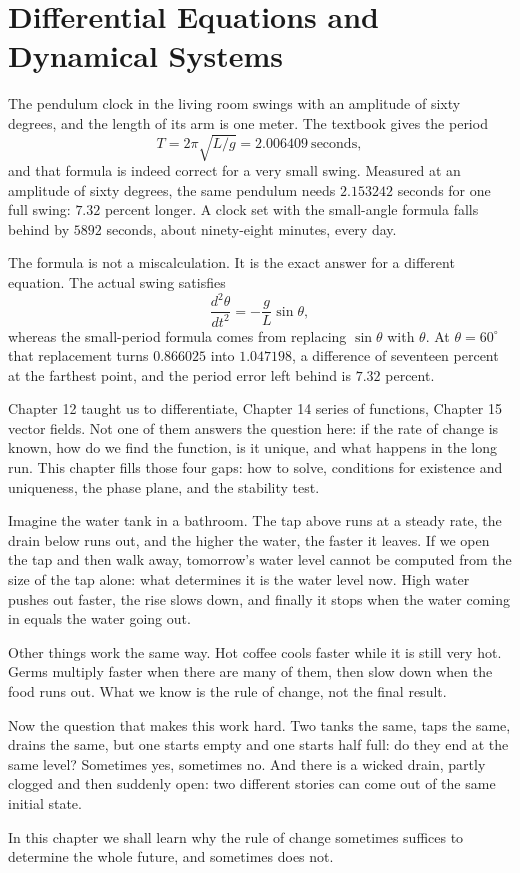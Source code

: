 \chapter{Differential Equations and Dynamical Systems}

The pendulum clock in the living room swings with an amplitude of sixty degrees, and the
length of its arm is one meter. The textbook gives the period
\[
T=2\pi\sqrt{L/g}=2.006409\ \text{seconds},
\]
and that formula is indeed correct for a very small swing. Measured at an amplitude of
sixty degrees, the same pendulum needs $2.153242$ seconds for one full swing: $7.32$
percent longer. A clock set with the small-angle formula falls behind by $5892$ seconds,
about ninety-eight minutes, every day.

The formula is not a miscalculation. It is the exact answer for a different equation.
The actual swing satisfies
\[
\frac{d^{2}\theta}{dt^{2}}=-\frac{g}{L}\sin\theta ,
\]
whereas the small-period formula comes from replacing $\sin\theta$ with $\theta$. At
$\theta=60^{\circ}$ that replacement turns $0.866025$ into $1.047198$, a difference of
seventeen percent at the farthest point, and the period error left behind is $7.32$
percent.

Chapter 12 taught us to differentiate, Chapter 14 series of functions, Chapter 15 vector
fields. Not one of them answers the question here: if the rate of change is known, how do we
find the function, is it unique, and what happens in the long run. This chapter fills those
four gaps: how to solve, conditions for existence and uniqueness, the phase plane, and the
stability test.

\begin{untukanak}
Imagine the water tank in a bathroom. The tap above runs at a steady rate, the drain below
runs out, and the higher the water, the faster it leaves. If we open the tap and then walk
away, tomorrow's water level cannot be computed from the size of the tap alone: what
determines it is the water level now. High water pushes out faster, the rise slows down,
and finally it stops when the water coming in equals the water going out.

Other things work the same way. Hot coffee cools faster while it is still very hot. Germs
multiply faster when there are many of them, then slow down when the food runs out. What we
know is the rule of change, not the final result.

Now the question that makes this work hard. Two tanks the same, taps the same, drains the
same, but one starts empty and one starts half full: do they end at the same level?
Sometimes yes, sometimes no. And there is a wicked drain, partly clogged and then suddenly
open: two different stories can come out of the same initial state.

In this chapter we shall learn why the rule of change sometimes suffices to determine the
whole future, and sometimes does not.
\end{untukanak}

